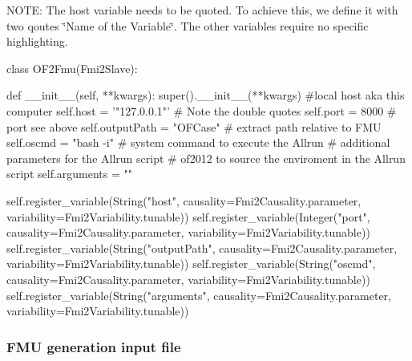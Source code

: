 N\+O\+TE\+: The host variable needs to be quoted. To achieve this, we define it with two qoutes \textquotesingle{}\char`\"{}\+Name of the Variable\char`\"{}\textquotesingle{}. The other variables require no specific highlighting.


\begin{DoxyCode}
class OF2Fmu(Fmi2Slave):


    def \_\_init\_\_(self, **kwargs):
        super().\_\_init\_\_(**kwargs)
        #local host aka this computer
        self.host = '"127.0.0.1"' # Note the double quotes
        self.port = 8000 # port see above
        self.outputPath = "OFCase" # extract path relative to FMU
        self.oscmd = "bash -i" # system command to execute the Allrun 
        # additional parameters for the Allrun script
        # of2012 to source the enviroment in the Allrun script
        self.arguments = "" 

        self.register\_variable(String("host",
            causality=Fmi2Causality.parameter, variability=Fmi2Variability.tunable))
        self.register\_variable(Integer("port",
             causality=Fmi2Causality.parameter, variability=Fmi2Variability.tunable))
        self.register\_variable(String("outputPath", 
            causality=Fmi2Causality.parameter, variability=Fmi2Variability.tunable))
        self.register\_variable(String("oscmd", 
            causality=Fmi2Causality.parameter, variability=Fmi2Variability.tunable))
        self.register\_variable(String("arguments", 
            causality=Fmi2Causality.parameter, variability=Fmi2Variability.tunable))
\end{DoxyCode}


\subsubsection*{F\+MU generation input file}

